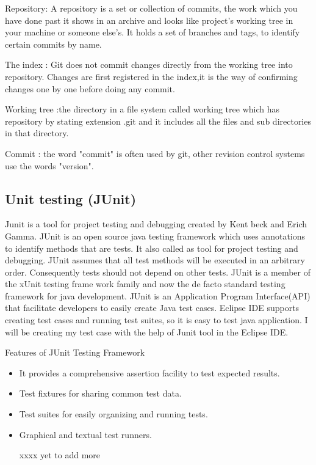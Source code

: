 \documentclass{article}
\begin{document}
Repository:  A repository is a set or collection of commits, the work which you have done past it shows in an archive and looks like project's working tree in your machine or someone else's. It holds a set of branches and tags, to identify certain commits by name.

The index : Git does not commit changes directly from the working tree into repository. Changes are first registered in the index,it is the way of confirming changes one by one before doing any commit.																										

Working tree :the directory in a file system called working tree which has repository by stating extension .git and it includes all the files and sub directories in that  directory.

Commit : the word "commit" is often used by git, other revision control systems use the words "version".


\subsection{Unit testing (JUnit)}
\label{sec:junit}

Junit is a tool for project testing and debugging created by Kent beck and Erich Gamma.
JUnit is an open source java testing framework which uses annotations to identify methods that are tests. It also called as tool for project testing and debugging. JUnit assumes that all test methods will be executed in an arbitrary order. Consequently tests should not depend on other tests.
JUnit is a member of the xUnit testing frame work family and now the de facto standard testing framework for java development. JUnit is an Application Program Interface(API) that facilitate developers to easily create Java test cases. 
Eclipse IDE supports creating test cases and running test suites, so it is easy to test java application.
I will be creating my test case with the help of Junit tool in the Eclipse IDE. 

Features of JUnit Testing Framework
\begin{itemize}

\item It provides a comprehensive assertion facility to test expected results.
\item Test fixtures for sharing common test data.
\item Test suites for easily organizing and running tests.
\item Graphical and textual test runners.

xxxx yet to add more 

\end{itemize}
\end{document}
